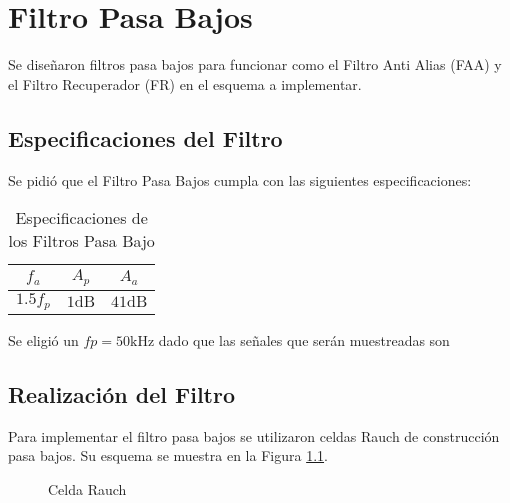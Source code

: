 \chapter{Filtro Pasa Bajos}
Se diseñaron filtros pasa bajos para funcionar como el Filtro Anti Alias (FAA) y el Filtro Recuperador (FR) en el esquema a implementar.
\section{Especificaciones del Filtro}
Se pidió que el Filtro Pasa Bajos cumpla con las siguientes especificaciones:

\begin{table}[ht]
    \centering
    \begin{tabular}{|c|c|c|}
        \hline
        $f_a$  &   $A_p$   &   $A_a$    \\
        \hline
        $1.5 f_p$   &   $1 \si{\deci\bel}$ &   $41 \si{\deci\bel}$    \\
        \hline
    \end{tabular}
    \caption{Especificaciones de los Filtros Pasa Bajo}
\end{table}

Se eligió un $fp = 50 \si{\kilo\hertz}$ dado que las señales que serán muestreadas son 

\section{Realización del Filtro}

Para implementar el filtro pasa bajos se utilizaron celdas Rauch de construcción pasa bajos. Su esquema se muestra en la Figura \ref{fig:Rauch-Cell}.

\begin{figure}[ht]
    \centering
    
    \caption{Celda Rauch}
    \label{fig:Rauch-Cell}
\end{figure}



